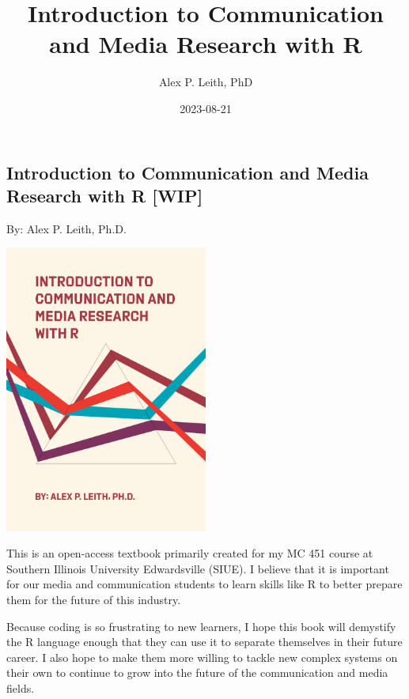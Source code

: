 \documentclass[
  b5paper]{book}
\title{Introduction to Communication and Media Research with R}
\author{Alex P. Leith, PhD}
\date{2023-08-21}
\begin{document}
\maketitle

{
\setcounter{tocdepth}{1}
\tableofcontents
}
\hypertarget{section}{%
\chapter*{}\label{section}}

\hypertarget{introduction-to-communication-and-media-research-with-r-wip}{%
\section*{Introduction to Communication and Media Research with R {[}WIP{]}}\label{introduction-to-communication-and-media-research-with-r-wip}}

By: Alex P. Leith, Ph.D.

\href{Current\%20Book\%20Cover\%20(Art\%20created\%20with\%20R\textquotesingle{}s\%20aRtsy\%20package)}{\includegraphics[width=0.5\textwidth,height=\textheight]{cover_2.png}}

This is an open-access textbook primarily created for my MC 451 course at Southern Illinois University Edwardsville (SIUE). I believe that it is important for our media and communication students to learn skills like R to better prepare them for the future of this industry.

Because coding is so frustrating to new learners, I hope this book will demystify the R language enough that they can use it to separate themselves in their future career. I also hope to make them more willing to tackle new complex systems on their own to continue to grow into the future of the communication and media fields.
\end{document}
